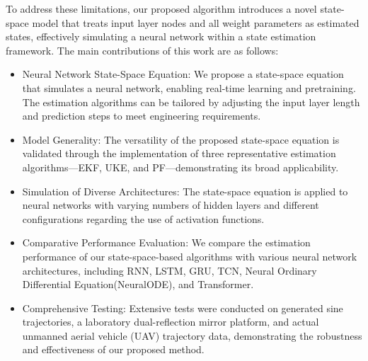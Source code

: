 \documentclass[sn-nature]{sn-jnl}%
\theoremstyle{thmstyleone}%
\theoremstyle{thmstyletwo}%
\theoremstyle{thmstylethree}%
\begin{document}
To address these limitations, our proposed algorithm introduces a novel state-space model that treats input layer nodes and all weight parameters as estimated states, effectively simulating a neural network within a state estimation framework. The main contributions of this work are as follows:

\begin{itemize}
  
\item Neural Network State-Space Equation: We propose a state-space equation that simulates a neural network, enabling real-time learning and pretraining. The estimation algorithms can be tailored by adjusting the input layer length and prediction steps to meet engineering requirements.

\item Model Generality: The versatility of the proposed state-space equation is validated through the implementation of three representative estimation algorithms—EKF, UKE, and PF—demonstrating its broad applicability.

\item Simulation of Diverse Architectures: The state-space equation is applied to neural networks with varying numbers of hidden layers and different configurations regarding the use of activation functions.

\item Comparative Performance Evaluation: We compare the estimation performance of our state-space-based algorithms with various neural network architectures, including RNN, LSTM, GRU, TCN, Neural Ordinary Differential Equation(NeuralODE), and Transformer.

\item Comprehensive Testing: Extensive tests were conducted on generated sine trajectories, a laboratory dual-reflection mirror platform, and actual unmanned aerial vehicle (UAV) trajectory data, demonstrating the robustness and effectiveness of our proposed method.

\end{itemize}
\end{document}
